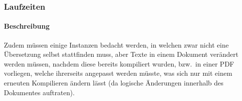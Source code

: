 \subsubsection{Laufzeiten}
\paragraph*{Beschreibung}
Zudem müssen einige Instanzen bedacht werden, in welchen zwar nicht eine Übersetzung selbst stattfinden muss, aber Texte in einem Dokument verändert werden müssen, nachdem diese bereits kompiliert wurden, bzw.\ in einer PDF vorliegen, welche ihrerseits angepasst werden müsste, was sich nur mit einem erneuten Kompilieren ändern lässt (da logische Änderungen innerhalb des Dokumentes auftraten).%




